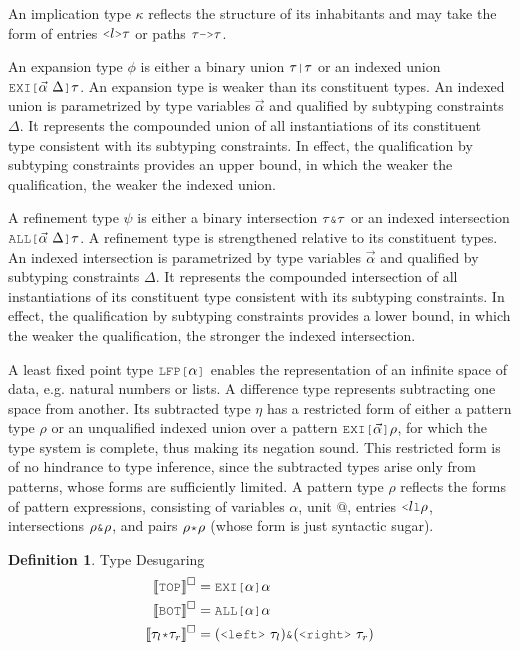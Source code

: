 \documentclass[acmsmall]{acmart}
\theoremstyle{definition}
\newtheorem{definition}{Definition}[section]
\begin{document}
An implication type $\kappa$ reflects the structure of 
its inhabitants and may take the form of  
entries $\J{<}l\J{>}\tau$ or paths $\tau \J{->} \tau$.

An expansion type $\phi$ is either a binary union $\tau \J{|} \tau$ or 
an indexed union $\J{EXI[}\vec{\alpha}\ \Delta\J{]}\tau$.
An expansion type is weaker than its constituent types. 
An indexed union is parametrized by type variables $\vec{\alpha}$ 
and qualified by subtyping constraints $\Delta$.
It represents the compounded union of all instantiations of its constituent type 
consistent with its subtyping constraints.
In effect, the qualification by subtyping constraints provides an upper bound, in which
the weaker the qualification, the weaker the indexed union.

A refinement type $\psi$ is either a binary intersection $\tau \J{\&} \tau$ or 
an indexed intersection $\J{ALL[} \vec{\alpha}\ \Delta \J{]}\tau$.
A refinement type is strengthened relative to its constituent types. 
An indexed intersection is parametrized by type variables $\vec{\alpha}$ 
and qualified by subtyping constraints $\Delta$.
It represents the compounded intersection of all instantiations of its constituent type 
consistent with its subtyping constraints.
In effect, the qualification by subtyping constraints provides a lower bound, in which
the weaker the qualification, the stronger the indexed intersection.

A least fixed point type $\J{LFP[}\alpha \J{]}$ 
enables the representation of an infinite space of data,
e.g. natural numbers or lists. 
A difference type represents subtracting one space from another.
Its subtracted type $\eta$ has a restricted form of either
a pattern type $\rho$ or an unqualified indexed union 
over a pattern $\J{EXI[}\vec{\alpha} \J{]} \rho$, for which the type system
is complete, thus making its negation sound.  
This restricted form is of no hindrance to type inference, since the 
subtracted types arise only from patterns, whose forms are sufficiently
limited.
A pattern type $\rho$ reflects the forms of pattern expressions, consisting of 
variables $\alpha$, unit $@$, entries $\J{<} l \J{l} \rho$, intersections $\rho \J{\&} \rho$,
and pairs $\rho \J{*} \rho$ (whose form is just syntactic sugar).


\hfill
\begin{definition} 
  \label{def:type_desugaring}
  Type Desugaring 
  \hfill 
  \boxed{\llbracket \gamma \rrbracket^\square = \tau}
  \\
  \begin{align*}
    \llbracket \J{TOP} \rrbracket^\square &= \J{EXI[} \alpha \J{]} \alpha
    \\
    \llbracket \J{BOT} \rrbracket^\square &= \J{ALL[} \alpha \J{]} \alpha
    \\
    \llbracket \tau_l \J{*} \tau_r \rrbracket^\square &= (\J{<left>}\ \tau_l)  \J{\&} (\J{<right>}\ \tau_r)
  \end{align*}
\end{definition} 
\hfill
\end{document}
